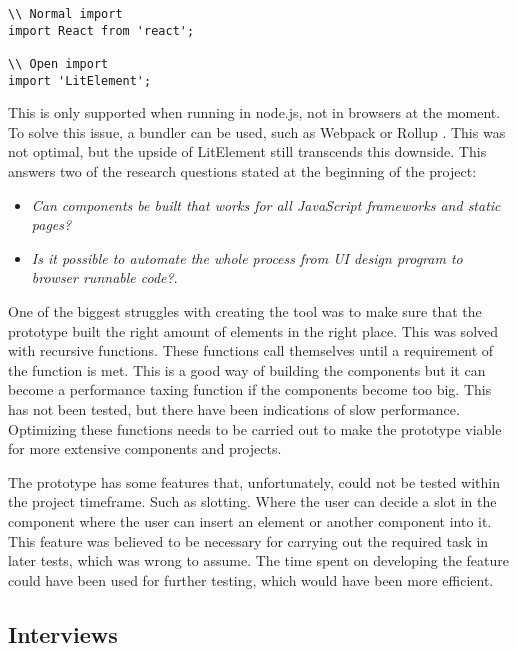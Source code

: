\begin{lstlisting}[style=htmlcssjs]
\\ Normal import
import React from 'react';

\\ Open import 
import 'LitElement';
\end{lstlisting}

This is only supported when running in node.js, not in browsers at the moment. To solve this issue, a bundler can be used, such as Webpack \cite{Webpack} or Rollup \cite{RollupJs}. This was not optimal, but the upside of LitElement still transcends this downside. This answers two of the research questions stated at the beginning of the project:
\begin{itemize}
  \item \textit{Can components be built that works for all JavaScript frameworks and static pages?} 
  \item \textit{Is it possible to automate the whole process from UI design program to browser runnable code?}.
\end{itemize}

One of the biggest struggles with creating the tool was to make sure that the prototype built the right amount of elements in the right place. This was solved with recursive functions. These functions call themselves until a requirement of the function is met. This is a good way of building the components but it can become a performance taxing function if the components become too big. This has not been tested, but there have been indications of slow performance. Optimizing these functions needs to be carried out to make the prototype viable for more extensive components and projects.

The prototype has some features that, unfortunately, could not be tested within the project timeframe. Such as slotting. Where the user can decide a slot in the component where the user can insert an element or another component into it. This feature was believed to be necessary for carrying out the required task in later tests, which was wrong to assume. The time spent on developing the feature could have been used for further testing, which would have been more efficient.



\subsection{Interviews}%
\label{sub:Interviews}


